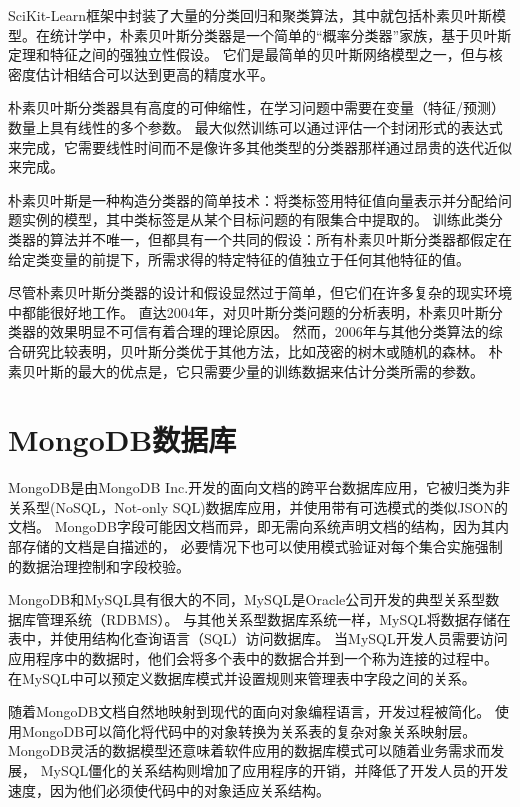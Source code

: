 SciKit-Learn框架中封装了大量的分类回归和聚类算法，其中就包括朴素贝叶斯模型。在统计学中，朴素贝叶斯分类器是一个简单的“概率分类器”家族\cite{larranaga2013review}，基于贝叶斯定理和特征之间的强独立性假设。
它们是最简单的贝叶斯网络模型之一，但与核密度估计相结合可以达到更高的精度水平\cite{piryonesi2020role}。

朴素贝叶斯分类器具有高度的可伸缩性，在学习问题中需要在变量（特征/预测）数量上具有线性的多个参数。
最大似然训练可以通过评估一个封闭形式的表达式来完成\cite{russell2002artificial}，它需要线性时间而不是像许多其他类型的分类器那样通过昂贵的迭代近似来完成。

朴素贝叶斯是一种构造分类器的简单技术：将类标签用特征值向量表示并分配给问题实例的模型，其中类标签是从某个目标问题的有限集合中提取的。
训练此类分类器的算法并不唯一，但都具有一个共同的假设：所有朴素贝叶斯分类器都假定在给定类变量的前提下，所需求得的特定特征的值独立于任何其他特征的值。

尽管朴素贝叶斯分类器的设计和假设显然过于简单，但它们在许多复杂的现实环境中都能很好地工作。
直达2004年，对贝叶斯分类问题的分析表明，朴素贝叶斯分类器的效果明显不可信有着合理的理论原因。
然而，2006年与其他分类算法的综合研究比较表明，贝叶斯分类优于其他方法，比如茂密的树木或随机的森林。
朴素贝叶斯的最大的优点是，它只需要少量的训练数据来估计分类所需的参数\cite{10.1145/1143844.1143865}。

\section{MongoDB数据库}

MongoDB是由MongoDB Inc.开发的面向文档的跨平台数据库应用，它被归类为非关系型(NoSQL，Not-only SQL)数据库应用，并使用带有可选模式的类似JSON的文档。
MongoDB字段可能因文档而异，即无需向系统声明文档的结构，因为其内部存储的文档是自描述的，
必要情况下也可以使用模式验证对每个集合实施强制的数据治理控制和字段校验。

MongoDB和MySQL具有很大的不同\cite{Győrödi2015comparative}，MySQL是Oracle公司开发的典型关系型数据库管理系统（RDBMS）。
与其他关系型数据库系统一样，MySQL将数据存储在表中，并使用结构化查询语言（SQL）访问数据库。
当MySQL开发人员需要访问应用程序中的数据时，他们会将多个表中的数据合并到一个称为连接的过程中。
在MySQL中可以预定义数据库模式并设置规则来管理表中字段之间的关系。

随着MongoDB文档自然地映射到现代的面向对象编程语言，开发过程被简化。
使用MongoDB可以简化将代码中的对象转换为关系表的复杂对象关系映射层。
MongoDB灵活的数据模型还意味着软件应用的数据库模式可以随着业务需求而发展，
MySQL僵化的关系结构则增加了应用程序的开销，并降低了开发人员的开发速度，因为他们必须使代码中的对象适应关系结构。

